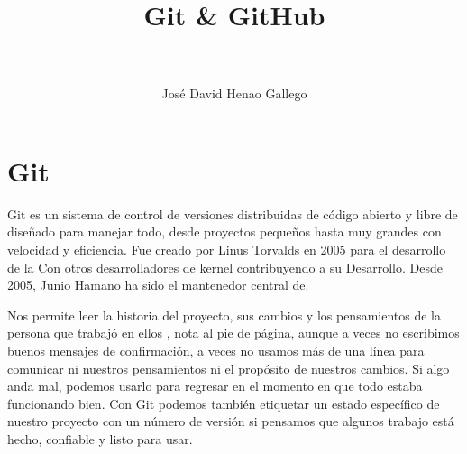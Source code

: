 \documentclass[a4paper,11pt]{article}
\title{Git \& GitHub}
\author{\\\\ José David Henao Gallego}
\begin{document}
\maketitle
\tableofcontents

\section{Git}
Git es un sistema de control de versiones distribuidas de código abierto y libre
de diseñado para manejar todo, desde proyectos pequeños hasta muy grandes con
velocidad y eficiencia. Fue creado por Linus Torvalds en 2005 para el desarrollo
de la Con otros desarrolladores de kernel contribuyendo a su  Desarrollo. Desde
2005, Junio Hamano ha sido el mantenedor central de.

Nos permite leer la historia del proyecto, sus cambios y los pensamientos de la
persona que trabajó en ellos , nota al pie de página, aunque a veces no
escribimos buenos mensajes de confirmación, a veces no usamos más de una línea
para comunicar ni nuestros pensamientos ni el propósito de nuestros cambios. Si
algo anda mal, podemos usarlo para regresar en el momento en que todo estaba
funcionando bien. Con Git podemos también etiquetar un estado específico de
nuestro proyecto con un número de versión si pensamos que algunos trabajo está
hecho, confiable y listo para usar.
\end{document}
